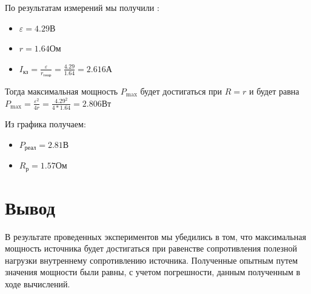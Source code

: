\documentclass[14pt, a4paper, twoside]{extreport}
\begin{document}
По результатам измерений мы получили :
\begin{itemize}
  \item  $\varepsilon = 4.29 \text{В}$
  \item $r = 1.64 \text{Ом}$
  \item $I_\text{кз} = \frac{\varepsilon}{r_\text{теор}} = \frac{4.29}{1.64} = 2.616 \text{А}$
\end{itemize}

Тогда максимальная мощность $P_\text{max}$ будет достигаться при $R = r$ и будет равна $P_\text{max} = \frac{\varepsilon^2}{4r} = \frac{4.29^2}{4*1.64} = 2.806 \text{Вт}$


Из графика получаем:
\begin{itemize}
  \item  $P_\text{реал} = 2.81 \text{В}$
  \item $R_\text{р} = 1.57 \text{Ом}$
\end{itemize}

\section{Вывод}

В результате проведенных экспериментов мы убедились в том,  что максимальная мощность источника будет достигаться при равенстве сопротивления полезной нагрузки внутреннему сопротивлению источника. Полученные опытным путем значения мощности были равны, с учетом погрешности, данным полученным в ходе вычислений.
\end{document}
